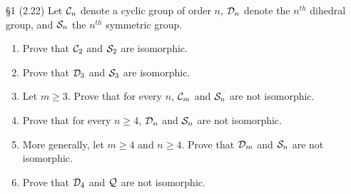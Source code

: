 \documentclass{homework}
\begin{document}
\begin{problem}{\S 1}
  (2.22) Let $\mathcal{C}_n$ denote a cyclic group of order $n$, $\mathcal{D}_n$ denote the $n^{th}$ dihedral group,
  and $\mathcal{S}_n$ the $n^{th}$ symmetric group.
  \begin{enumerate}[label=(\alph*)]
    \item Prove that $\mathcal{C}_2$ and $\mathcal{S}_2$ are isomorphic.
    \item Prove that $\mathcal{D}_3$ and $\mathcal{S}_3$ are isomorphic.
    \item Let $m\ge 3$. Prove that for every $n$, $\mathcal{C}_m$ and $ \mathcal{S}_n$ are not isomorphic.
    \item Prove that for every $n\ge 4$, $\mathcal{D}_n$ and $ \mathcal{S}_n$ are not isomorphic.
    \item More generally, let $m\ge 4$ and $n\ge 4$. Prove that $\mathcal{D}_m$ and $\mathcal{S}_n$ are not
      isomorphic.
    \item Prove that $ \mathcal{D}_4$ and $\mathcal{Q}$ are not isomorphic.
  \end{enumerate}
\end{problem}
\end{document}
